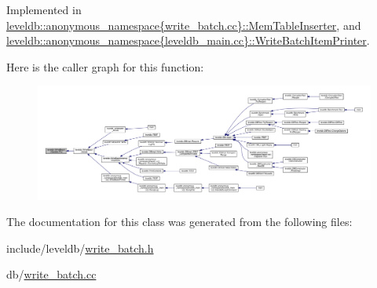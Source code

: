 Implemented in \hyperlink{classleveldb_1_1anonymous__namespace_02write__batch_8cc_03_1_1_mem_table_inserter_a2646adc17ca9d4faf8c1fbec0ca2b7ed}{leveldb\+::anonymous\+\_\+namespace\{write\+\_\+batch.\+cc\}\+::\+Mem\+Table\+Inserter}, and \hyperlink{classleveldb_1_1anonymous__namespace_02leveldb__main_8cc_03_1_1_write_batch_item_printer_ac5b17dff7e9ca540a76711d682ea1661}{leveldb\+::anonymous\+\_\+namespace\{leveldb\+\_\+main.\+cc\}\+::\+Write\+Batch\+Item\+Printer}.



Here is the caller graph for this function\+:
\nopagebreak
\begin{figure}[H]
\begin{center}
\leavevmode
\includegraphics[width=350pt]{classleveldb_1_1_write_batch_1_1_handler_ad41d4985db289b94e29921167d206d4b_icgraph}
\end{center}
\end{figure}




The documentation for this class was generated from the following files\+:\begin{DoxyCompactItemize}
\item 
include/leveldb/\hyperlink{write__batch_8h}{write\+\_\+batch.\+h}\item 
db/\hyperlink{write__batch_8cc}{write\+\_\+batch.\+cc}\end{DoxyCompactItemize}
